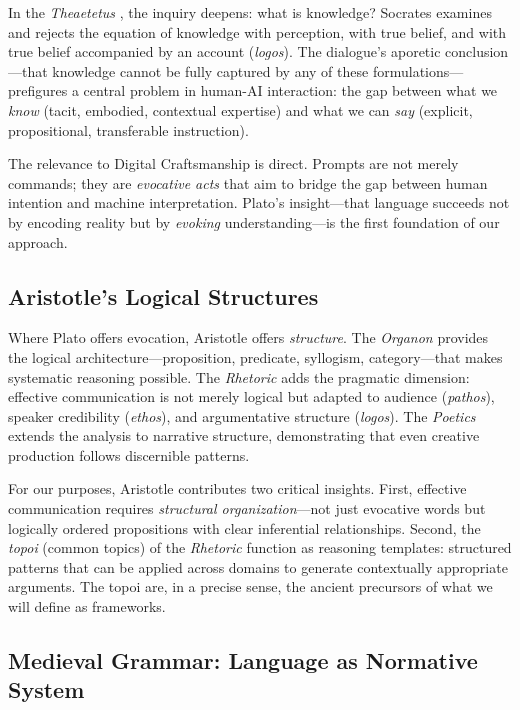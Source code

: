 \documentclass[12pt,a4paper]{article}
\begin{document}
In the \emph{Theaetetus} \cite{plato_theaetetus}, the inquiry deepens: what is knowledge? Socrates examines and rejects the equation of knowledge with perception, with true belief, and with true belief accompanied by an account (\emph{logos}). The dialogue's aporetic conclusion---that knowledge cannot be fully captured by any of these formulations---prefigures a central problem in human-AI interaction: the gap between what we \emph{know} (tacit, embodied, contextual expertise) and what we can \emph{say} (explicit, propositional, transferable instruction).

The relevance to Digital Craftsmanship is direct. Prompts are not merely commands; they are \emph{evocative acts} that aim to bridge the gap between human intention and machine interpretation. Plato's insight---that language succeeds not by encoding reality but by \emph{evoking} understanding---is the first foundation of our approach.

\subsection{Aristotle's Logical Structures}

Where Plato offers evocation, Aristotle offers \emph{structure}. The \emph{Organon} \cite{aristotle_organon} provides the logical architecture---proposition, predicate, syllogism, category---that makes systematic reasoning possible. The \emph{Rhetoric} \cite{aristotle_rhetoric} adds the pragmatic dimension: effective communication is not merely logical but adapted to audience (\emph{pathos}), speaker credibility (\emph{ethos}), and argumentative structure (\emph{logos}). The \emph{Poetics} \cite{aristotle_poetics} extends the analysis to narrative structure, demonstrating that even creative production follows discernible patterns.

For our purposes, Aristotle contributes two critical insights. First, effective communication requires \emph{structural organization}---not just evocative words but logically ordered propositions with clear inferential relationships. Second, the \emph{topoi} (common topics) of the \emph{Rhetoric} function as reasoning templates: structured patterns that can be applied across domains to generate contextually appropriate arguments. The topoi are, in a precise sense, the ancient precursors of what we will define as frameworks.

\subsection{Medieval Grammar: Language as Normative System}
\end{document}
